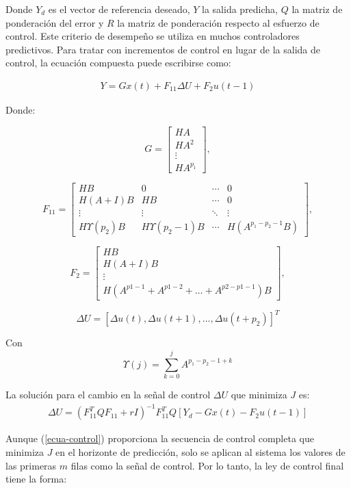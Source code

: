 \documentclass[journal]{IEEEtran}
\begin{document}
Donde \( Y_d \) es el vector de referencia deseado, \( Y \) la salida predicha,  \(Q\) la matriz de ponderación del error y \( R \) la matriz de ponderación respecto al esfuerzo de control. Este criterio de desempeño se utiliza en muchos controladores predictivos. Para tratar con incrementos de control en lugar de la salida de control, la ecuación compuesta puede escribirse como:

\begin{align}
Y = Gx(t) + F_{11} \Delta U + F_2 u(t - 1)
\end{align}

Donde:

\[
G = 
\begin{bmatrix}
HA \\
HA^2 \\
\vdots \\
HA^{p_1}
\end{bmatrix},
\]

\[
F_{11} = \begin{bmatrix}
    HB & 0 & \cdots & 0 \\
    H(A + I)B & HB & \cdots & 0 \\
    \vdots & \vdots & \ddots & \vdots \\
    H\varUpsilon(p_2)B & H\varUpsilon(p_2 - 1)B & \cdots & H(A^{p_1 - p_2 - 1}B)
\end{bmatrix},
\]

\[
F_2 = \begin{bmatrix}
    HB \\
    H(A + I)B \\
    \vdots \\
    H(A^{p1 - 1} + A^{p1 - 2} + \ldots + A^{p2 - p1 - 1})B
\end{bmatrix},
\]

\[
\Delta U = [\Delta u(t), \Delta u(t + 1), \ldots, \Delta u(t + p_2)]^T
\]

Con \[
\varUpsilon(j) = \sum_{k=0}^{j} A^{p_{1} - p_{2} - 1 + k}
\]


La solución para el cambio en la señal de control \( \Delta U \) que minimiza \( J \) es:
\begin{align}\label{ecua-control}
\Delta U = (F_{11}^T Q F_{11} + rI)^{-1} F_{11}^T Q \left[Y_d - Gx(t) - F_2 u(t - 1)\right]
\end{align}

Aunque (\ref{ecua-control}) proporciona la secuencia de control completa que minimiza \( J \) en el horizonte de predicción, solo se aplican al sistema los valores de las primeras \( m \) filas como la señal de control. Por lo tanto, la ley de control final tiene la forma:
\end{document}
